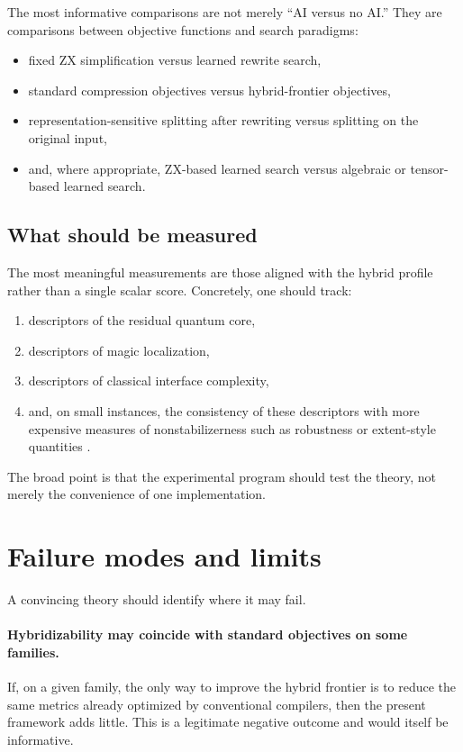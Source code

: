 \documentclass[11pt]{article}
\theoremstyle{remark}
\begin{document}
The most informative comparisons are not merely ``AI versus no AI.'' They are comparisons between objective functions and search paradigms:
\begin{itemize}[leftmargin=1.5em]
    \item fixed ZX simplification versus learned rewrite search,
    \item standard compression objectives versus hybrid-frontier objectives,
    \item representation-sensitive splitting after rewriting versus splitting on the original input,
    \item and, where appropriate, ZX-based learned search versus algebraic or tensor-based learned search.
\end{itemize}

\subsection{What should be measured}

The most meaningful measurements are those aligned with the hybrid profile rather than a single scalar score. Concretely, one should track:
\begin{enumerate}[label=(\alph*), leftmargin=1.5em]
    \item descriptors of the residual quantum core,
    \item descriptors of magic localization,
    \item descriptors of classical interface complexity,
    \item and, on small instances, the consistency of these descriptors with more expensive measures of nonstabilizerness such as robustness or extent-style quantities \cite{howard_campbell_2017, hamaguchi_et_al_2025}.
\end{enumerate}

The broad point is that the experimental program should test the theory, not merely the convenience of one implementation.

\section{Failure modes and limits}

A convincing theory should identify where it may fail.

\paragraph{Hybridizability may coincide with standard objectives on some families.}
If, on a given family, the only way to improve the hybrid frontier is to reduce the same metrics already optimized by conventional compilers, then the present framework adds little. This is a legitimate negative outcome and would itself be informative.
\end{document}
